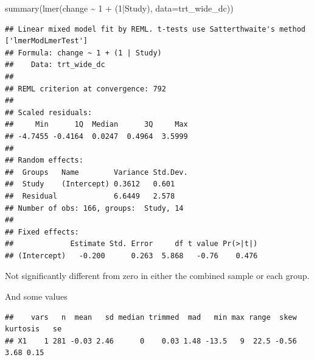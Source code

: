 \documentclass[
]{article}
\newenvironment{Shaded}{\begin{snugshade}}{\end{snugshade}}
\newcommand{\AttributeTok}[1]{\textcolor[rgb]{0.77,0.63,0.00}{#1}}
\newcommand{\DecValTok}[1]{\textcolor[rgb]{0.00,0.00,0.81}{#1}}
\newcommand{\FunctionTok}[1]{\textcolor[rgb]{0.00,0.00,0.00}{#1}}
\newcommand{\NormalTok}[1]{#1}
\newcommand{\SpecialCharTok}[1]{\textcolor[rgb]{0.00,0.00,0.00}{#1}}
\begin{document}
\begin{Shaded}
\begin{Highlighting}[]
\FunctionTok{summary}\NormalTok{(}\FunctionTok{lmer}\NormalTok{(change }\SpecialCharTok{\textasciitilde{}} \DecValTok{1} \SpecialCharTok{+}\NormalTok{ (}\DecValTok{1}\SpecialCharTok{|}\NormalTok{Study), }\AttributeTok{data=}\NormalTok{trt\_wide\_dc))}
\end{Highlighting}
\end{Shaded}

\begin{verbatim}
## Linear mixed model fit by REML. t-tests use Satterthwaite's method ['lmerModLmerTest']
## Formula: change ~ 1 + (1 | Study)
##    Data: trt_wide_dc
## 
## REML criterion at convergence: 792
## 
## Scaled residuals: 
##     Min      1Q  Median      3Q     Max 
## -4.7455 -0.4164  0.0247  0.4964  3.5999 
## 
## Random effects:
##  Groups   Name        Variance Std.Dev.
##  Study    (Intercept) 0.3612   0.601   
##  Residual             6.6449   2.578   
## Number of obs: 166, groups:  Study, 14
## 
## Fixed effects:
##             Estimate Std. Error     df t value Pr(>|t|)
## (Intercept)   -0.200      0.263  5.868   -0.76    0.476
\end{verbatim}

Not significantly different from zero in either the combined sample or
each group.

And some values

\begin{Shaded}
\end{Shaded}

\begin{verbatim}
##    vars   n  mean   sd median trimmed  mad   min max range  skew kurtosis   se
## X1    1 281 -0.03 2.46      0    0.03 1.48 -13.5   9  22.5 -0.56     3.68 0.15
\end{verbatim}

\begin{Shaded}
\end{Shaded}
\end{document}
